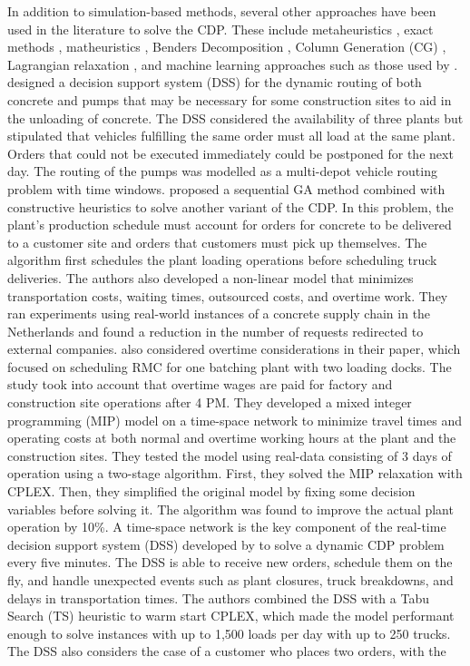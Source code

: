 \documentclass{article}
\begin{document}
In addition to simulation-based methods, several other approaches have been used in the literature to solve the CDP. These include metaheuristics \citep{faria2006distributed, misir2011selection, maghrebi2016sequential, yang2022concrete}, exact methods \citep{yan2007optimal, asbach2009analysis, kinable2014concrete}, matheuristics \citep{schmid2009hybrid, schmid2010hybridization}, Benders Decomposition \citep{maghrebi2014benders}, Column Generation (CG) \citep{maghrebi2014solving, maghrebi2016column}, Lagrangian relaxation \citep{narayanan2015using}, and machine learning approaches such as those used by \cite{graham2006modeling, maghrebi2014exploring, maghrebi2016matching}. \cite{matsatsinis2004towards} designed a decision support system (DSS) for the dynamic routing of both concrete and pumps that may be necessary for some construction sites to aid in the unloading of concrete. The DSS considered the availability of three plants but stipulated that vehicles fulfilling the same order must all load at the same plant. Orders that could not be executed immediately could be postponed for the next day. The routing of the pumps was modelled as a multi-depot vehicle routing problem with time windows. \cite{naso2007genetic} proposed a sequential GA method combined with constructive heuristics to solve another variant of the CDP. In this problem, the plant's production schedule must account for orders for concrete to be delivered to a customer site and orders that customers must pick up themselves. The algorithm first schedules the plant loading operations before scheduling truck deliveries. The authors also developed a non-linear model that minimizes transportation costs, waiting times, outsourced costs, and overtime work. They ran experiments using real-world instances of a concrete supply chain in the Netherlands and found a reduction in the number of requests redirected to external companies. \cite{yan2007optimal} also considered overtime considerations in their paper, which focused on scheduling RMC for one batching plant with two loading docks. The study took into account that overtime wages are paid for factory and construction site operations after 4 PM. They developed a mixed integer programming (MIP) model on a time-space network to minimize travel times and operating costs at both normal and overtime working hours at the plant and the construction sites. They tested the model using real-data consisting of 3 days of operation using a two-stage algorithm. First, they solved the MIP relaxation with CPLEX. Then, they simplified the original model by fixing some decision variables before solving it. The algorithm was found to improve the actual plant operation by 10\%. A time-space network is the key component of the real-time decision support system (DSS) developed by \cite{durbin2008or} to solve a dynamic CDP problem every five minutes. The DSS is able to receive new orders, schedule them on the fly, and handle unexpected events such as plant closures, truck breakdowns, and delays in transportation times. The authors combined the DSS with a Tabu Search (TS) heuristic to warm start CPLEX, which made the model performant enough to solve instances with up to 1,500 loads per day with up to 250 trucks. The DSS also considers the case of a customer who places two orders, with the 
\end{document}
